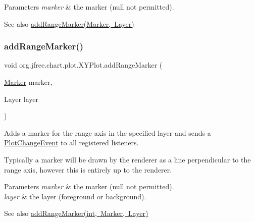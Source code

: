 \begin{DoxyParams}{Parameters}
{\em marker} & the marker ({\ttfamily null} not permitted).\\
\hline
\end{DoxyParams}
\begin{DoxySeeAlso}{See also}
\mbox{\hyperlink{classorg_1_1jfree_1_1chart_1_1plot_1_1_x_y_plot_a4cc8c235ec5d42bbd18328ef732cbd56}{add\+Range\+Marker(\+Marker, Layer)}} 
\end{DoxySeeAlso}
\mbox{\label{classorg_1_1jfree_1_1chart_1_1plot_1_1_x_y_plot_a4cc8c235ec5d42bbd18328ef732cbd56}} 
\subsubsection{\texorpdfstring{add\+Range\+Marker()}{addRangeMarker()}\hspace{0.1cm}{\footnotesize\ttfamily [2/4]}}
{\footnotesize\ttfamily void org.\+jfree.\+chart.\+plot.\+X\+Y\+Plot.\+add\+Range\+Marker (\begin{DoxyParamCaption}\item[{\mbox{\hyperlink{classorg_1_1jfree_1_1chart_1_1plot_1_1_marker}{Marker}}}]{marker,  }\item[{Layer}]{layer }\end{DoxyParamCaption})}

Adds a marker for the range axis in the specified layer and sends a \mbox{\hyperlink{}{Plot\+Change\+Event}} to all registered listeners. 

Typically a marker will be drawn by the renderer as a line perpendicular to the range axis, however this is entirely up to the renderer.


\begin{DoxyParams}{Parameters}
{\em marker} & the marker ({\ttfamily null} not permitted). \\
\hline
{\em layer} & the layer (foreground or background).\\
\hline
\end{DoxyParams}
\begin{DoxySeeAlso}{See also}
\mbox{\hyperlink{classorg_1_1jfree_1_1chart_1_1plot_1_1_x_y_plot_a2bf8119a33276c7e4cb87a8d9e2ceedb}{add\+Range\+Marker(int, Marker, Layer)}} 
\end{DoxySeeAlso}
\mbox{\label{classorg_1_1jfree_1_1chart_1_1plot_1_1_x_y_plot_a2bf8119a33276c7e4cb87a8d9e2ceedb}} 
